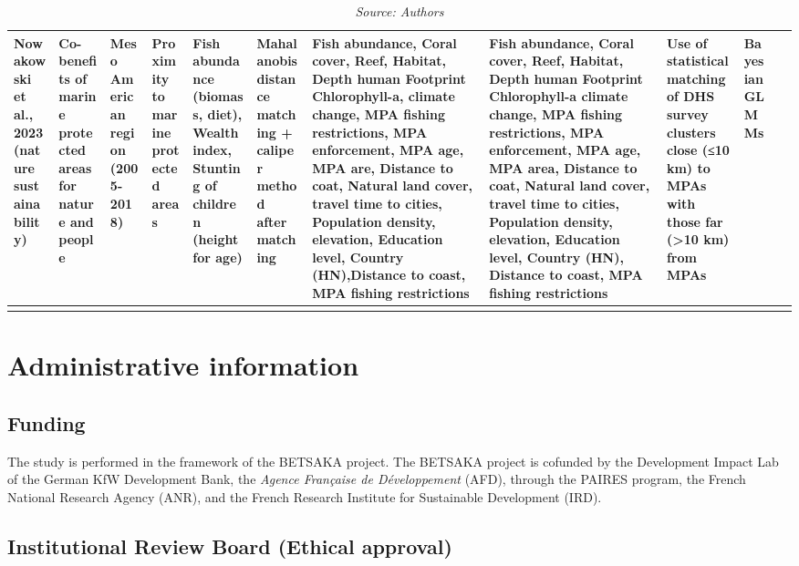 \documentclass[
]{article}
\begin{document}
\begin{landscape}
\begin{longtable}{|p{1.6cm}|p{1.5cm}|p{1.5cm}|p{1.5cm}|p{1.7cm}|p{1.6 cm}|p{1.9cm}|p{1.9cm}|p{2 cm}|p{1.5cm}|p{2 cm}|}
        Nowakowski et al., 2023 (nature sustainability) & Co-benefits of marine protected areas for nature and people & Meso American region (2005-2018) & Proximity to marine protected areas & Fish abundance (biomass, diet), Wealth index, Stunting of children (height for age) & Mahalanobis distance matching + caliper method after matching & Fish abundance, Coral cover, Reef, Habitat, Depth human Footprint Chlorophyll-a, climate change, MPA fishing restrictions, MPA enforcement, MPA age, MPA are, Distance to coat, Natural land cover, travel time to cities, Population density, elevation, Education level, Country (HN),Distance to coast, MPA fishing restrictions & Fish abundance, Coral cover, Reef, Habitat, Depth human Footprint Chlorophyll-a climate change, MPA fishing restrictions, MPA enforcement, MPA age, MPA area, Distance to coat, Natural land cover, travel time to cities, Population density, elevation, Education level, Country (HN), Distance to coast, MPA fishing restrictions & Use of statistical matching of DHS survey clusters close (≤10 km) to MPAs with those far (>10 km) from MPAs & Bayesian GLMMs & ~ \\ 
       \hline
    \caption*{\textit{Source: Authors}}
\end{longtable}
\end{landscape}

\section{Administrative information}\label{administrative-information}

\subsection{Funding}\label{funding}

The study is performed in the framework of the BETSAKA project. The
BETSAKA project is cofunded by the Development Impact Lab of the German
KfW Development Bank, the \emph{Agence Française de Développement}
(AFD), through the PAIRES program, the French National Research Agency
(ANR), and the French Research Institute for Sustainable Development
(IRD).

\subsection{Institutional Review Board (Ethical
approval)}\label{institutional-review-board-ethical-approval}
\end{document}
